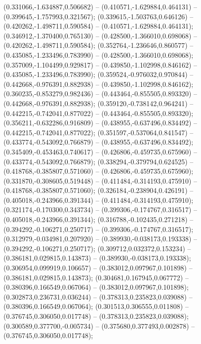  (0.331066,-1.634887,0.506682) -- (0.410571,-1.629884,0.464131) -- (0.399645,-1.757993,0.321567);
 (0.339615,-1.503763,0.646126) -- (0.420262,-1.498711,0.590584) -- (0.410571,-1.629884,0.464131);
 (0.346912,-1.370400,0.765130) -- (0.428500,-1.366010,0.698068) -- (0.420262,-1.498711,0.590584);
 (0.352764,-1.236646,0.860577) -- (0.435085,-1.233496,0.783990) -- (0.428500,-1.366010,0.698068);
 (0.357009,-1.104499,0.929817) -- (0.439850,-1.102998,0.846162) -- (0.435085,-1.233496,0.783990);
 (0.359524,-0.976032,0.970844) -- (0.442668,-0.976391,0.882938) -- (0.439850,-1.102998,0.846162);
 (0.360235,-0.853279,0.982436) -- (0.443464,-0.855505,0.893320) -- (0.442668,-0.976391,0.882938);
 (0.359120,-0.738142,0.964241) -- (0.442215,-0.742041,0.877022) -- (0.443464,-0.855505,0.893320);
 (0.356211,-0.632286,0.916809) -- (0.438955,-0.637496,0.834492) -- (0.442215,-0.742041,0.877022);
 (0.351597,-0.537064,0.841547) -- (0.433774,-0.543092,0.766879) -- (0.438955,-0.637496,0.834492);
 (0.345409,-0.453463,0.740617) -- (0.426806,-0.459735,0.675960) -- (0.433774,-0.543092,0.766879);
 (0.338294,-0.379794,0.624525) -- (0.418768,-0.385807,0.571060) -- (0.426806,-0.459735,0.675960);
 (0.331870,-0.308605,0.519448) -- (0.411484,-0.314193,0.475910) -- (0.418768,-0.385807,0.571060);
 (0.326184,-0.238904,0.426191) -- (0.405018,-0.243966,0.391344) -- (0.411484,-0.314193,0.475910);
 (0.321174,-0.170300,0.343734) -- (0.399306,-0.174767,0.316517) -- (0.405018,-0.243966,0.391344);
 (0.316788,-0.102435,0.271218) -- (0.394292,-0.106271,0.250717) -- (0.399306,-0.174767,0.316517);
 (0.312979,-0.034981,0.207920) -- (0.389930,-0.038173,0.193338) -- (0.394292,-0.106271,0.250717);
 (0.309712,0.032372,0.153234) -- (0.386181,0.029815,0.143873) -- (0.389930,-0.038173,0.193338);
 (0.306954,0.099919,0.106657) -- (0.383012,0.097967,0.101898) -- (0.386181,0.029815,0.143873);
 (0.304681,0.167945,0.067772) -- (0.380396,0.166549,0.067064) -- (0.383012,0.097967,0.101898);
 (0.302873,0.236731,0.036244) -- (0.378313,0.235823,0.039088) -- (0.380396,0.166549,0.067064);
 (0.301513,0.306555,0.011808) -- (0.376745,0.306050,0.017748) -- (0.378313,0.235823,0.039088);
 (0.300589,0.377700,-0.005734) -- (0.375680,0.377493,0.002878) -- (0.376745,0.306050,0.017748);
